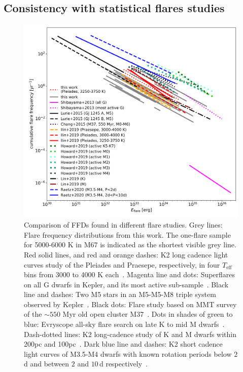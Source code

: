 \documentclass{aa}
\begin{document}
\subsection{Consistency with statistical flares studies}
\label{sec:consistency_other_work}
\begin{figure}[ht!]
    \centering
    \includegraphics[width=13.5cm]{pics/FFDs/discussion_FFDs.png}
    \caption{Comparison of FFDs found in different flare studies. Grey lines: Flare frequency distributions from this work. The one-flare sample for 5000-6000 K in M67 is indicated as the shortest visible grey line. Red solid lines, and red and orange dashes: K2 long cadence light curves study of the Pleiades and Praesepe, respectively, in four $T_\mathrm{eff}$ bins from 3000 to 4000 K each~. Magenta line and dots: Superflares on all G dwarfs in Kepler, and its most active sub-sample~\citep{shibayama2013}. Black line and dashes: Two M5 stars in an M5-M5-M8 triple system observed by Kepler~\citep{lurie2015}. Black dots: Flare study based on MMT survey of the $\sim550$ Myr old open cluster M37~\citep{chang2015}. Dots in shades of green to blue: Evryscope all-sky flare search on late K to mid M dwarfs~\citep{howard2019}. Dash-dotted lines: K2 long-cadence study of K and M dwarfs within 200pc and 100pc~\citep{lin2019}. Dark blue line and dashes: K2 short cadence light curves of M3.5-M4 dwarfs with known rotation periods below $2\,$d and between $2$ and $10\,$d respectively~\citep{raetz2020}.}          
    \label{fig:otherwork}
\end{figure}
\end{document}
